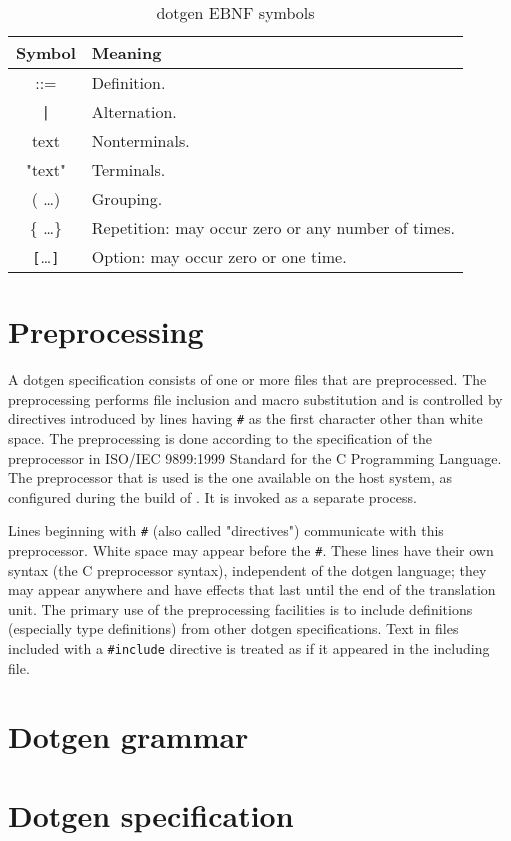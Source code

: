\begin{table}
\caption{dotgen EBNF symbols}
\centering
\begin{tabular}{|cl|}
\doublehline
Symbol & Meaning\\
\hline
::=                     & Definition.\\
\verb#|#                & Alternation.\\
text                    & Nonterminals.\\
"text"                  & Terminals.\\
( \ldots )              & Grouping.\\
\{ \ldots \}            & Repetition: may occur zero or any number of times.\\
\verb#[#\ldots\verb#]#  & Option: may occur zero or one time.\\
\hline
\end{tabular}
\label{table:iff:ebnf}
\end{table}

\section{Preprocessing}
\label{sec:iff:preproc}

A dotgen specification consists of one or more files that are preprocessed. The
preprocessing performs file inclusion  and macro substitution and is controlled
by directives introduced by lines having  {\tt \#} as the first character other
than white space.  The preprocessing is done according  to the specification of
the  preprocessor   in  ISO/IEC  9899:1999  Standard  for   the  C  Programming
Language.  The preprocessor  that is  used  is the  one available  on the  host
system, as configured during the build of \GenoM{}. It is invoked as a separate
process.

Lines beginning with {\tt \#}  (also called "directives") communicate with this
preprocessor.  White  space may appear before  the {\tt \#}.   These lines have
their  own  syntax (the  C  preprocessor  syntax),  independent of  the  dotgen
language; they may appear anywhere and  have effects that last until the end of
the translation  unit.  The primary use  of the preprocessing  facilities is to
include   definitions   (especially  type   definitions)   from  other   dotgen
specifications.  Text  in files  included with a  {\tt \#include}  directive is
treated as if it appeared in the including file.

\section{Dotgen grammar}



\section{Dotgen specification}

   
   
   
   
